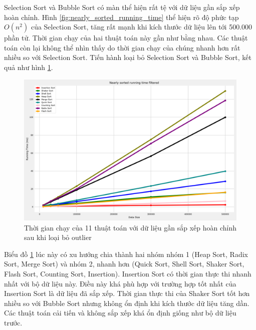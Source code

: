 Selection Sort và Bubble Sort có màn thể hiện rất tệ với dữ liệu gần sắp xếp hoàn chỉnh. Hình \ref{fig:nearly_sorted_running_time} thể hiện rõ độ phức tạp $O(n^2)$ của Selection Sort, tăng rất mạnh khi kích thước dữ liệu lên tới 500.000 phần tử. Thời gian chạy của hai thuật toán này gần như bằng nhau. Các thuật toán còn lại không thể nhìn thấy do thời gian chạy của chúng nhanh hơn rất nhiều so với Selection Sort. Tiến hành loại bỏ Selection Sort và Bubble Sort, kết quả như hình \ref{fig:nearly_sorted_running_time_filtered}.


\begin{figure}[H]
    \centering
    \includegraphics[width=\textwidth]{experimental_result/images/nearly_sorted_running_time_filtered.png}
    \caption{Thời gian chạy của 11 thuật toán với dữ liệu gần sắp xếp hoàn chỉnh sau khi loại bỏ outlier}
    \label{fig:nearly_sorted_running_time_filtered}
\end{figure}

Biểu đồ \ref{fig:nearly_sorted_running_time_filtered} lúc này có xu hướng chia thành hai nhóm nhóm 1 (Heap Sort, Radix Sort, Merge Sort) và nhóm 2, nhanh hơn (Quick Sort, Shell Sort, Shaker Sort, Flash Sort, Counting Sort, Insertion). Insertion Sort có thời gian thực thi nhanh nhất với bộ dữ liệu này. Điều này khá phù hợp với trường hợp tốt nhất của Insertion Sort là dữ liệu đã sắp xếp. Thời gian thực thi của Shaker Sort tốt hơn nhiều so với Bubble Sort nhưng không ổn định khi kích thước dữ liệu tăng dần. Các thuật toán cải tiến và không sắp xếp khá ổn định giống như bộ dữ liệu trước.




